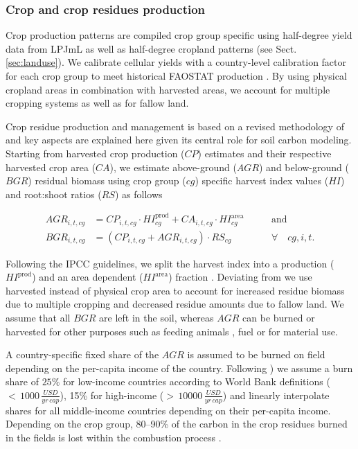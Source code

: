 \documentclass[gc, manuscript]{copernicus}
\begin{document}
\hypertarget{sec:residues}{%
\subsubsection{Crop and crop residues production}\label{sec:residues}}

Crop production patterns are compiled crop group specific using half-degree yield data from LPJmL \citep{schaphoff_lpjml4_2018} as well as half-degree cropland patterns (see Sect. \ref{sec:landuse}). We calibrate cellular yields with a country-level calibration factor for each crop group to meet historical FAOSTAT production \citep{faostat_faostat_2016}. By using physical cropland areas in combination with harvested areas, we account for multiple cropping systems as well as for fallow land.

Crop residue production and management is based on a revised methodology of \citep{bodirsky_n2o_2012} and key aspects are explained here given its central role for soil carbon modeling. Starting from harvested crop production (\(CP\)) estimates and their respective harvested crop area (\(CA\)), we estimate above-ground (\(AGR\)) and below-ground (\(BGR\)) residual biomass using crop group (\(cg\)) specific harvest index values (\(HI\)) and root:shoot ratios (\(RS\)) as follows

\begin{equation}
\begin{aligned}
AGR_{i,t,cg} & = CP_{i,t,cg} \cdot HI^{\mathrm{prod}}_{cg} + CA_{i,t,cg} \cdot HI^{\mathrm{area}}_{cg}
\qquad & \textrm{and} \\
BGR_{i,t,cg} & = (CP_{i,t,cg} + AGR_{i,t,cg}) \cdot RS_{cg} \qquad                                            & \forall\quad cg, i, t.
\label{eq:resbiomass}
\end{aligned}
\end{equation}

Following the IPCC guidelines, we split the harvest index into a production (\(HI^{\mathrm{prod}}\)) and an area dependent (\(HI^{\mathrm{area}}\)) fraction \citep{eggleston_ipcc_2006}. Deviating from \citep{bodirsky_n2o_2012} we use harvested instead of physical crop area to account for increased residue biomass due to multiple cropping and decreased residue amounts due to fallow land. We assume that all \(BGR\) are left in the soil, whereas \(AGR\) can be burned or harvested for other purposes such as feeding animals \citep{weindl_livestock_2017}, fuel or for material use.

A country-specific fixed share of the \(AGR\) is assumed to be burned on field depending on the per-capita income of the country. Following \citep{smil_nitrogen_1999}) we assume a burn share of \(25\%\) for low-income countries according to World Bank definitions (\(<\,1000\,\tfrac{USD}{yr\,cap}\)), 15\% for high-income (\(>\,10000\,\tfrac{USD}{yr\,cap}\)) and linearly interpolate shares for all middle-income countries depending on their per-capita income. Depending on the crop group, 80--90\% of the carbon in the crop residues burned in the fields is lost within the combustion process \citep{eggleston_ipcc_2006}.
\end{document}
